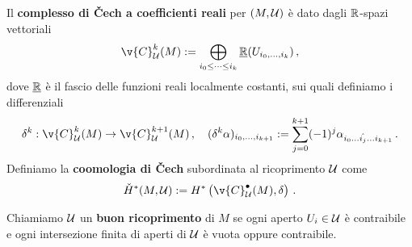 \begin{ex!}
	\begin{df}
		Il \textbf{complesso di \v{C}ech a coefficienti reali} per $(M,\mathcal{U})$ 
		è dato dagli ${\mathbb R}$-spazi vettoriali
		\begin{equation*}
			\v{C}_{\Uu}^{k}(M) := \bigoplus_{i_{0} \le \dots \le i_{k}} \underline{\R}(U_{i_{0}, \dots, i_{k}})\,,
		\end{equation*}
		dove $\underline{{\mathbb R}}$ è il fascio delle funzioni reali localmente costanti,
		sui quali definiamo i differenziali
		\begin{equation*}
			\delta^{k}: \v{C}^{k}_{\Uu}(M) \to \v{C}^{k+1}_{\Uu}(M)\,, \quad
			(\delta^{k}\alpha)_{i_{0}, \dots, i_{k+1}} :=
			\sum_{j=0}^{k+1} (-1)^{j} \alpha_{i_{0} \dots \hat{i_{j}} \dots i_{k+1}}\,.
		\end{equation*}
		Definiamo la \textbf{coomologia di \v{C}ech} subordinata al ricoprimento $\mathcal{U}$
		come
		\begin{equation*}
			\check{H}^{*}(M, \Uu) := H^{*}\left( \v{C}^{\bullet}_{\Uu}(M), \delta \right) \,.
		\end{equation*}
	\end{df}		
	
	Chiamiamo $\mathcal{U}$ un \textbf{buon ricoprimento} di $M$ se ogni aperto $U_{i} \in \mathcal{U}$
	è contraibile e ogni intersezione finita di aperti di $\mathcal{U}$ è vuota oppure contraibile.
		

\end{ex!}
